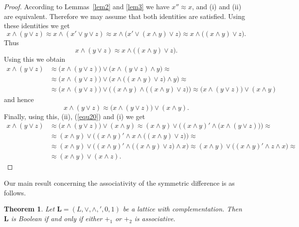 \documentclass[12pt]{article}
\newtheorem{theorem}{Theorem}[section]
\begin{document}
\begin{proof}
According to Lemmas~\ref{lem2} and \ref{lem3} we have $x''\approx x$, and (i) and (ii) are equivalent. Therefore we may assume that both identities are satisfied. Using these identities we get
\[
x\wedge(y\vee z)\approx x\wedge(x'\vee y\vee z)\approx x\wedge\big(x'\vee(x\wedge y)\vee z\big)\approx x\wedge\big((x\wedge y)\vee z\big).
\]
Thus
\begin{equation}\label{equ20}
x\wedge(y\vee z)\approx x\wedge\big((x\wedge y)\vee z\big).
\end{equation}
Using this we obtain
\begin{align*}
x\wedge(y\vee z) & \approx\big(x\wedge(y\vee z)\big)\vee\big(x\wedge(y\vee z)\wedge y\big)\approx \\
                 & \approx\big(x\wedge(y\vee z)\big)\vee\Big(x\wedge\big((x\wedge y)\vee z\big)\wedge y\Big)\approx \\
                 & \approx\big(x\wedge(y\vee z)\big)\vee\Big((x\wedge y)\wedge\big((x\wedge y)\vee z\big)\Big)\approx\big(x\wedge(y\vee z)\big)\vee(x\wedge y)
\end{align*}
and hence
\[
x\wedge(y\vee z)\approx\big(x\wedge(y\vee z)\big)\vee(x\wedge y).
\]
Finally, using this, (ii), (\ref{equ20}) and (i) we get
\begin{align*}
x\wedge (y\vee z) & \approx\big(x\wedge(y\vee z)\big)\vee(x\wedge y)\approx(x\wedge y)\vee\Big((x\wedge y)'\wedge\big(x\wedge(y\vee z)\big)\Big)\approx \\
                  & \approx(x\wedge y)\vee\Big((x\wedge y)'\wedge x\wedge\big((x\wedge y)\vee z\big)\Big)\approx \\
                  & \approx(x\wedge y)\vee\Big((x\wedge y)'\wedge\big((x\wedge y)\vee z\big)\wedge x\Big)\approx(x\wedge y)\vee\big((x\wedge y)'\wedge z\wedge x\big)\approx \\
                  & \approx(x\wedge y)\vee(x\wedge z).
\end{align*}
\end{proof}

Our main result concerning the associativity of the symmetric difference is as follows.

\begin{theorem}\label{th5}
Let $\mathbf L=(L,\vee,\wedge,{}',0,1)$ be a lattice with complementation. Then $\mathbf L$ is Boolean if and only if either $+_1$ or $+_2$ is associative.
\end{theorem}
\end{document}
